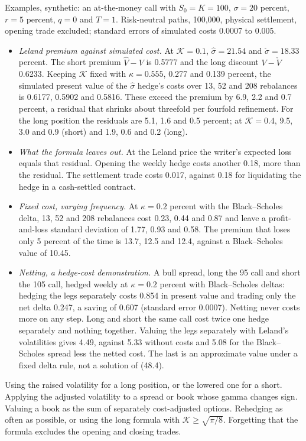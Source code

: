 \begin{qfmethod}
Examples, synthetic: an at-the-money call with $S_0=K=100$, $\sigma=20$ percent, $r=5$ percent, $q=0$ and $T=1$. Risk-neutral paths, 100{,}000, physical settlement, opening trade excluded; standard errors of simulated costs 0.0007 to 0.005.
\begin{itemize}
\item \emph{Leland premium against simulated cost.} At $\mathcal K=0.1$, $\hat\sigma=21.54$ and $\check\sigma=18.33$ percent. The short premium $\hat V-V$ is 0.5777 and the long discount $V-\check V$ 0.6233. Keeping $\mathcal K$ fixed with $\kappa=0.555$, 0.277 and 0.139 percent, the simulated present value of the $\hat\sigma$ hedge's costs over 13, 52 and 208 rebalances is 0.6177, 0.5902 and 0.5816. These exceed the premium by 6.9, 2.2 and 0.7 percent, a residual that shrinks about threefold per fourfold refinement. For the long position the residuals are 5.1, 1.6 and 0.5 percent; at $\mathcal K=0.4$, 9.5, 3.0 and 0.9 (short) and 1.9, 0.6 and 0.2 (long).
\item \emph{What the formula leaves out.} At the Leland price the writer's expected loss equals that residual. Opening the weekly hedge costs another 0.18, more than the residual. The settlement trade costs 0.017, against 0.18 for liquidating the hedge in a cash-settled contract.
\item \emph{Fixed cost, varying frequency.} At $\kappa=0.2$ percent with the Black--Scholes delta, 13, 52 and 208 rebalances cost 0.23, 0.44 and 0.87 and leave a profit-and-loss standard deviation of 1.77, 0.93 and 0.58. The premium that loses only 5 percent of the time is 13.7, 12.5 and 12.4, against a Black--Scholes value of 10.45.
\item \emph{Netting, a hedge-cost demonstration.} A bull spread, long the 95 call and short the 105 call, hedged weekly at $\kappa=0.2$ percent with Black--Scholes deltas: hedging the legs separately costs 0.854 in present value and trading only the net delta 0.247, a saving of 0.607 (standard error 0.0007). Netting never costs more on any step. Long and short the same call cost twice one hedge separately and nothing together. Valuing the legs separately with Leland's volatilities gives 4.49, against 5.33 without costs and 5.08 for the Black--Scholes spread less the netted cost. The last is an approximate value under a fixed delta rule, not a solution of (48.4).
\end{itemize}

 Using the raised volatility for a long position, or the lowered one for a short. Applying the adjusted volatility to a spread or book whose gamma changes sign. Valuing a book as the sum of separately cost-adjusted options. Rehedging as often as possible, or using the long formula with $\mathcal K\ge\sqrt{\pi/8}$. Forgetting that the formula excludes the opening and closing trades.


\end{qfmethod}

